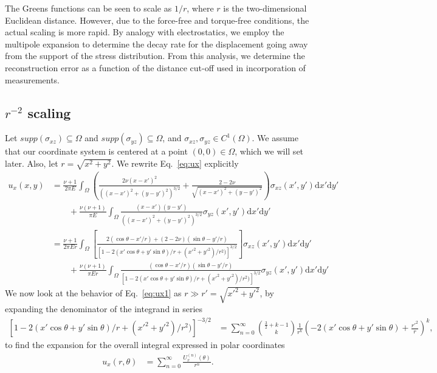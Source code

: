 \documentclass{article}
\newcommand{\dd}{\mathrm{d}}
\begin{document}
The Greens functions can be seen to scale as $1/r$, where $r$ is the two-dimensional Euclidean distance. However, due to the force-free and torque-free conditions, the actual scaling is more rapid. By analogy with electrostatics, we employ the multipole expansion to determine the decay rate for the displacement going away from the support of the stress distribution. From this analysis, we determine the reconstruction error as a function of the distance cut-off used in incorporation of measurements.


\subsection{$r^{-2}$ scaling}

Let $supp(\sigma_{xz}) \subseteq \Omega$ and $supp(\sigma_{yz}) \subseteq\Omega$, and  $\sigma_{xz}, \sigma_{yz} \in C^1(\Omega)$.
We assume that our coordinate system is centered at a point $(0,0)\in\Omega$, which we will set later.  Also, let $r=\sqrt{x^2+y^2}$.
We rewrite Eq.~\ref{eq:ux} explicitly
\begin{align}
u_x(x,y) &=\frac{\nu+1}{2\pi E} \int_\Omega \left(\frac{2\nu (x-x')^2}{( (x-x')^2+(y-y')^2)^{3/2}} + \frac{2-2\nu}{\sqrt{(x-x')^2+(y-y')^2}}   \right)
 \sigma_{xz}(x',y') \dd x'\dd y' \nonumber\\
 &\qquad+  \frac{\nu(\nu+1)}{\pi E} \int_\Omega   \frac{(x-x')(y-y')}{ ( (x-x')^2+(y-y')^2)^{3/2}} \sigma_{yz}(x',y')  \dd x'\dd y'  \nonumber\\
 &= \frac{\nu+1}{2\pi E r}   \int_\Omega \left[  \frac{  2(\cos\theta-x'/r) + (2-2\nu)(\sin\theta-y'/r) }{ [1-2(x'\cos\theta +y'\sin\theta)/r + (x'^2+y'^2)/r^2)]^{3/2} }\right] \sigma_{xz}(x',y')  \dd x' \dd y' \nonumber\\
 &\qquad +  \frac{\nu(\nu+1)}{\pi E r} \int_\Omega \frac{(\cos\theta - x'/r)(\sin\theta - y'/r)}{[ 1-2(x'\cos\theta +y'\sin\theta)/r + (x'^2+y'^2)/r^2)]^{3/2} }\sigma_{yz}(x',y')\dd x' \dd y'
\label{eq:ux1}
\end{align}
We now look at the behavior of Eq.~\ref{eq:ux1} as $r\gg r' = \sqrt{x'^2+y'^2}$, by expanding the denominator of the integrand in series
\begin{align}
\left[1-2(x'\cos\theta +y'\sin\theta)/r + (x'^2+y'^2)/r^2)\right]^{-3/2} &= \sum_{n=0}^\infty {{\frac{3}{2}+k-1}\choose{k}}\frac{1}{r^k}\left( -2(x'\cos\theta + y'\sin\theta) + \frac{r'^2}{r}  \right)^k,
\end{align}
to find the expansion for the overall integral expressed in polar coordinates
\begin{align}
u_x(r,\theta) &= \sum_{n=0}^\infty \frac{U_x^{(n)}(\theta)}{r^n}.
\end{align}
\end{document}
